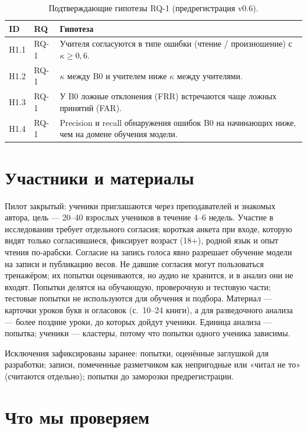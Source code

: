 \begin{table}[ht]
\centering\small
\caption{Подтверждающие гипотезы RQ-1 (предрегистрация v0.6).}
\label{tab:hyp}
\begin{tabularx}{\linewidth}{@{}llL@{}}
\toprule
ID & RQ & Гипотеза \\
\midrule
H1.1 & RQ-1 & Учителя согласуются в типе ошибки (чтение / произношение) с $\kappa \ge 0{,}6$. \\
H1.2 & RQ-1 & $\kappa$ между B0 и учителем ниже $\kappa$ между учителями. \\
H1.3 & RQ-1 & У B0 ложные отклонения (FRR) встречаются чаще ложных принятий (FAR). \\
H1.4 & RQ-1 & Precision и recall обнаружения ошибок B0 на начинающих ниже, чем на домене обучения модели. \\
\bottomrule
\end{tabularx}
\end{table}

\section{Участники и материалы}\label{sec:method-participants}

Пилот закрытый: ученики приглашаются через преподавателей и знакомых автора, цель --- 20--40 взрослых
учеников в течение 4--6 недель. Участие в исследовании требует отдельного согласия; короткая анкета при
входе, которую видят только согласившиеся, фиксирует возраст (18+), родной язык и опыт чтения по-арабски.
Согласие на запись голоса явно разрешает обучение модели на записи и публикацию весов.
Не давшие согласия могут пользоваться тренажёром; их попытки оцениваются, но аудио не хранится, и в анализ
они не входят. Попытки делятся на обучающую, проверочную и тестовую части; тестовые попытки не используются для обучения и подбора. Материал --- карточки уроков букв и огласовок (с.~10--24 книги), а для разведочного
анализа --- более поздние уроки, до которых дойдут ученики. Единица анализа --- попытка; ученики ---
кластеры, потому что попытки одного ученика зависимы.

Исключения зафиксированы заранее: попытки, оценённые заглушкой для разработки; записи, помеченные
разметчиком как непригодные или «читал не то» (считаются отдельно); попытки до заморозки
предрегистрации.

\section{Что мы проверяем}\label{sec:method-scope}


